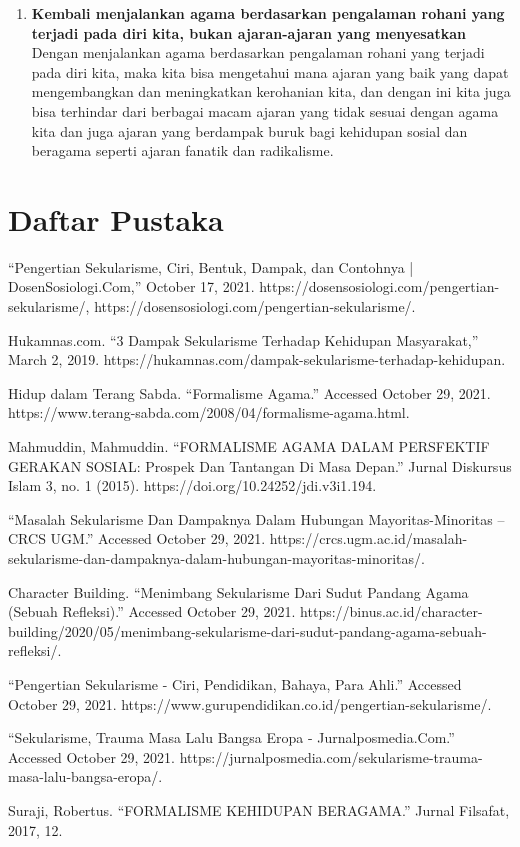\documentclass[
  12pt,
]{article}
\begin{document}
\begin{enumerate}
    \item \textbf{Kembali menjalankan agama berdasarkan pengalaman rohani yang terjadi pada diri kita, bukan ajaran-ajaran yang menyesatkan} \\
    Dengan menjalankan agama berdasarkan pengalaman rohani yang terjadi pada diri kita, maka kita bisa mengetahui mana ajaran yang baik yang dapat mengembangkan dan meningkatkan kerohanian kita, dan dengan ini kita juga bisa terhindar dari berbagai macam ajaran yang tidak sesuai dengan agama kita dan juga ajaran yang berdampak buruk bagi kehidupan sosial dan beragama seperti ajaran fanatik dan radikalisme.
    \end{enumerate}

    \pagebreak
    \section*{Daftar Pustaka}
    “Pengertian Sekularisme, Ciri, Bentuk, Dampak, dan Contohnya | DosenSosiologi.Com,” October 17, 2021. https://dosensosiologi.com/pengertian-sekularisme/, https://dosensosiologi.com/pengertian-sekularisme/.

    Hukamnas.com. “3 Dampak Sekularisme Terhadap Kehidupan Masyarakat,” March 2, 2019. https://hukamnas.com/dampak-sekularisme-terhadap-kehidupan.

    Hidup dalam Terang Sabda. “Formalisme Agama.” Accessed October 29, 2021. https://www.terang-sabda.com/2008/04/formalisme-agama.html.

    Mahmuddin, Mahmuddin. “FORMALISME AGAMA DALAM PERSFEKTIF GERAKAN SOSIAL: Prospek Dan Tantangan Di Masa Depan.” Jurnal Diskursus Islam 3, no. 1 (2015). https://doi.org/10.24252/jdi.v3i1.194.

    “Masalah Sekularisme Dan Dampaknya Dalam Hubungan Mayoritas-Minoritas – CRCS UGM.” Accessed October 29, 2021. https://crcs.ugm.ac.id/masalah-sekularisme-dan-dampaknya-dalam-hubungan-mayoritas-minoritas/.

    Character Building. “Menimbang Sekularisme Dari Sudut Pandang Agama (Sebuah Refleksi).” Accessed October 29, 2021. https://binus.ac.id/character-building/2020/05/menimbang-sekularisme-dari-sudut-pandang-agama-sebuah-refleksi/.

    “Pengertian Sekularisme - Ciri, Pendidikan, Bahaya, Para Ahli.” Accessed October 29, 2021. https://www.gurupendidikan.co.id/pengertian-sekularisme/.

    “Sekularisme, Trauma Masa Lalu Bangsa Eropa - Jurnalposmedia.Com.” Accessed October 29, 2021. https://jurnalposmedia.com/sekularisme-trauma-masa-lalu-bangsa-eropa/.

    Suraji, Robertus. “FORMALISME KEHIDUPAN BERAGAMA.” Jurnal Filsafat, 2017, 12.

		
\end{document}

